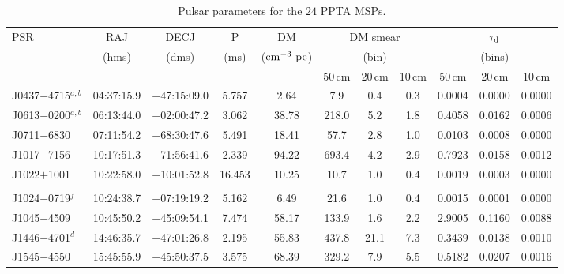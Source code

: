 \documentclass[useAMS,usenatbib]{mn2e}
\begin{document}
\begin{table}
\caption{Pulsar parameters for the $24$ PPTA MSPs.}
\label{psr}
\begin{center}
\begin{tabular}{lcccccccccc}
\hline
PSR                  &  RAJ      &  DECJ    &   P     &       DM               &     \multicolumn{3}{c}{DM smear}   &   \multicolumn{3}{c}{$\tau_{\rm{d}}$}       \\
                     &  (hms)    &  (dms)   &  (ms)   &  ($\rm{cm^{-3}\ pc}$)  &     \multicolumn{3}{c}{(bin)}      &   \multicolumn{3}{c}{(bins)}                \\
			               &           &          &         &                        &  50\,cm  & 20\,cm  & 10\,cm        & 50\,cm  &     20\,cm      & 10\,cm          \\
\hline
J0437$-$4715$^{a,b}$ & 04:37:15.9  &  $-$47:15:09.0 &  5.757  &  2.64     & 7.9      & 0.4       & 0.3    &  0.0004  &  0.0000  &  0.0000  \\ 
J0613$-$0200$^{a,b}$ & 06:13:44.0  &  $-$02:00:47.2 &  3.062  &  38.78    & 218.0    & 5.2       & 1.8    &  0.4058  &  0.0162  &  0.0006  \\ 
J0711$-$6830         & 07:11:54.2  &  $-$68:30:47.6 &  5.491  &  18.41    & 57.7     & 2.8       & 1.0    &  0.0103  &  0.0008  &  0.0000  \\ 
J1017$-$7156         & 10:17:51.3  &  $-$71:56:41.6 &  2.339  &  94.22    & 693.4    & 4.2       & 2.9    &  0.7923  &  0.0158  &  0.0012  \\ 
J1022$+$1001         & 10:22:58.0  &  $+$10:01:52.8 &  16.453 &  10.25    & 10.7     & 1.0       & 0.4    &  0.0019  &  0.0003  &  0.0000  \\ 
                     &             &                &         &           &          &           &        &          &          &          \\ 
J1024$-$0719$^{f}$   & 10:24:38.7  &  $-$07:19:19.2 &  5.162  &  6.49     & 21.6     & 1.0       & 0.4    &  0.0015  &  0.0001  &  0.0000  \\ 
J1045$-$4509         & 10:45:50.2  &  $-$45:09:54.1 &  7.474  &  58.17    & 133.9    & 1.6       & 2.2    &  2.9005  &  0.1160  &  0.0088  \\ 
J1446$-$4701$^{d}$   & 14:46:35.7  &  $-$47:01:26.8 &  2.195  &  55.83    & 437.8    & 21.1      & 7.3    &  0.3439  &  0.0138  &  0.0010  \\ 
J1545$-$4550         & 15:45:55.9  &  $-$45:50:37.5 &  3.575  &  68.39    & 329.2    & 7.9       & 5.5    &  0.5182  &  0.0207  &  0.0016  \\ 

\end{tabular}
\end{center}
\end{table}
\end{document}
